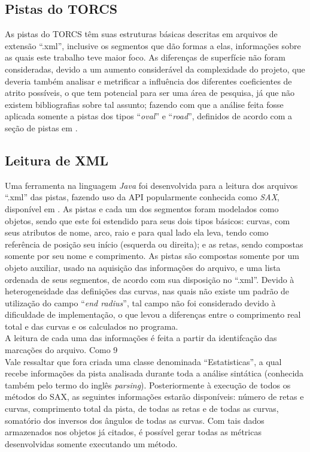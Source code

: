 \documentclass[journal]{IEEEtran}
\begin{document}
\subsection{Pistas do TORCS}
  As pistas do TORCS\cite{TORCS} têm suas estruturas básicas descritas em arquivos de extensão ``.xml'', inclusive os segmentos que dão formas a elas, informações sobre as quais este trabalho teve maior foco. As diferenças de superfície não foram consideradas, devido a um aumento considerável da complexidade do projeto, que deveria também analisar e metrificar a influência dos diferentes coeficientes de atrito possíveis, o que tem potencial para ser uma área de pesquisa, já que não existem bibliografias sobre tal assunto; fazendo com que a análise feita fosse aplicada somente a pistas dos tipos ``\textit{oval}'' e ``\textit{road}'', definidos de acordo com a seção de pistas em \cite{berniw}. 

\subsection{Leitura de XML}
  Uma ferramenta na linguagem \textit{Java}\cite{Java} foi desenvolvida para a leitura dos arquivos ``.xml'' das pistas, fazendo uso da API popularmente conhecida como \textit{SAX}\cite{SAX}, disponível em \cite{meuGit}. As pistas e cada um dos segmentos foram modelados como objetos, sendo que este foi estendido para seus dois tipos básicos: curvas, com seus atributos de nome, arco, raio e para qual lado ela leva, tendo como referência de posição seu início (esquerda ou direita); e as retas, sendo compostas somente por seu nome e comprimento. As pistas são compostas somente por um objeto auxiliar, usado na aquisição das informações do arquivo, e uma lista ordenada de seus segmentos, de acordo com sua disposição no ``.xml''. Devido à heterogeneidade das definições das curvas, nas quais não existe um padrão de utilização do campo ``\textit{end radius}'', tal campo não foi considerado devido à dificuldade de implementação, o que levou a diferenças entre o comprimento real total e das curvas e os calculados no programa.
  \\
  A leitura de cada uma das informações é feita a partir da identifcação das marcações do arquivo. Como 9
  \\
  Vale ressaltar que fora criada uma classe denominada ``Estatisticas'', a qual recebe informações da pista analisada durante toda a análise sintática (conhecida também pelo termo do inglês \textit{parsing}). Posteriormente à execução de todos os métodos do SAX, as seguintes informações estarão disponíveis: número de retas e curvas, comprimento total da pista, de todas as retas e de todas as curvas, somatório dos inversos dos ângulos de todas as curvas. Com tais dados armazenados nos objetos já citados, é possível gerar todas as métricas desenvolvidas somente executando um método.
\end{document}
